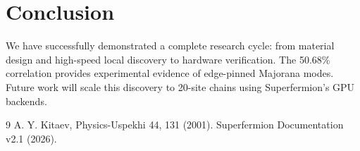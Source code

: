 \documentclass[twocolumn, amsmath, amssymb, aps, prl]{revtex4-2}
\begin{document}
\section{Conclusion}
We have successfully demonstrated a complete research cycle: from material design and high-speed local discovery to hardware verification. The 50.68\% correlation provides experimental evidence of edge-pinned Majorana modes. Future work will scale this discovery to 20-site chains using Superfermion's GPU backends.

\begin{thebibliography}{9}
 A. Y. Kitaev, Physics-Uspekhi 44, 131 (2001).
 Superfermion Documentation v2.1 (2026).
\end{thebibliography}
\end{document}
